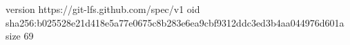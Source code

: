 version https://git-lfs.github.com/spec/v1
oid sha256:b025528e21d418e5a77e0675c8b283e6ea9cbf9312ddc3ed3b4aa044976d601a
size 69
